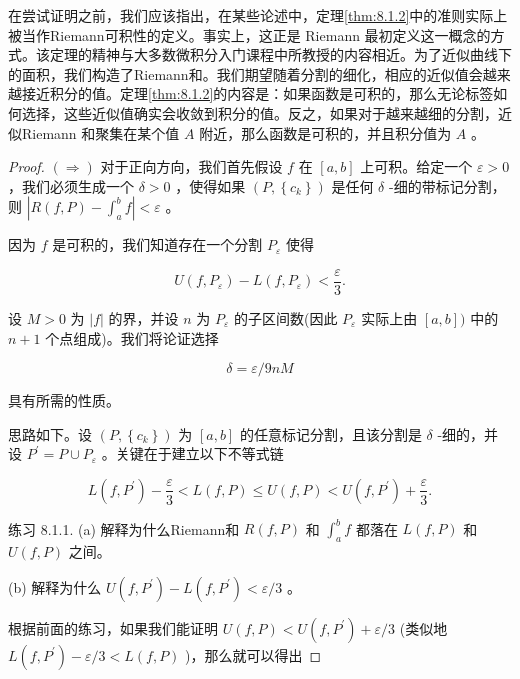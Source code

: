 在尝试证明之前，我们应该指出，在某些论述中，定理\ref{thm:8.1.2}中的准则实际上被当作Riemann可积性的定义。事实上，这正是 Riemann 最初定义这一概念的方式。该定理的精神与大多数微积分入门课程中所教授的内容相近。为了近似曲线下的面积，我们构造了Riemann和。我们期望随着分割的细化，相应的近似值会越来越接近积分的值。定理\ref{thm:8.1.2}的内容是：如果函数是可积的，那么无论标签如何选择，这些近似值确实会收敛到积分的值。反之，如果对于越来越细的分割，近似Riemann 和聚集在某个值 \(A\) 附近，那么函数是可积的，并且积分值为 \(A\) 。

\begin{proof}
\(\left(  \Rightarrow  \right)\) 对于正向方向，我们首先假设 \(f\) 在 \(\left\lbrack  {a,b}\right\rbrack\) 上可积。给定一个 \(\varepsilon  > 0\) ，我们必须生成一个 \(\delta  > 0\) ，使得如果 \(\left( {P,\left\{  {c}_{k}\right\}  }\right)\) 是任何 \(\delta\) -细的带标记分割，则 \(\left| {R\left( {f,P}\right)  - {\int }_{a}^{b}f}\right|  < \varepsilon\) 。

因为 \(f\) 是可积的，我们知道存在一个分割 \({P}_{\varepsilon }\) 使得

\[
U\left( {f,{P}_{\varepsilon }}\right)  - L\left( {f,{P}_{\varepsilon }}\right)  < \frac{\varepsilon }{3}.
\]

设 \(M > 0\) 为 \(\left| f\right|\) 的界，并设 \(n\) 为 \({P}_{\varepsilon }\) 的子区间数(因此 \({P}_{\varepsilon }\) 实际上由 \(\left\lbrack  {a,b}\right\rbrack  )\) 中的 \(n + 1\) 个点组成)。我们将论证选择

\[
\delta  = \varepsilon /{9nM}
\]

具有所需的性质。

思路如下。设 \(\left( {P,\left\{  {c}_{k}\right\}  }\right)\) 为 \(\left\lbrack  {a,b}\right\rbrack\) 的任意标记分割，且该分割是 \(\delta\) -细的，并设 \({P}^{\prime } = P \cup  {P}_{\varepsilon }\) 。关键在于建立以下不等式链

\[
L\left( {f,{P}^{\prime }}\right)  - \frac{\varepsilon }{3} < L\left( {f,P}\right)  \leq  U\left( {f,P}\right)  < U\left( {f,{P}^{\prime }}\right)  + \frac{\varepsilon }{3}.
\]

练习 8.1.1. (a) 解释为什么Riemann和 \(R\left( {f,P}\right)\) 和 \({\int }_{a}^{b}f\) 都落在 \(L\left( {f,P}\right)\) 和 \(U\left( {f,P}\right)\) 之间。

(b) 解释为什么 \(U\left( {f,{P}^{\prime }}\right)  - L\left( {f,{P}^{\prime }}\right)  < \varepsilon /3\) 。

根据前面的练习，如果我们能证明 \(U\left( {f,P}\right)  < U\left( {f,{P}^{\prime }}\right)  + \varepsilon /3\) (类似地 \(L\left( {f,{P}^{\prime }}\right)  - \varepsilon /3 < L\left( {f,P}\right)\) )，那么就可以得出


\end{proof}
